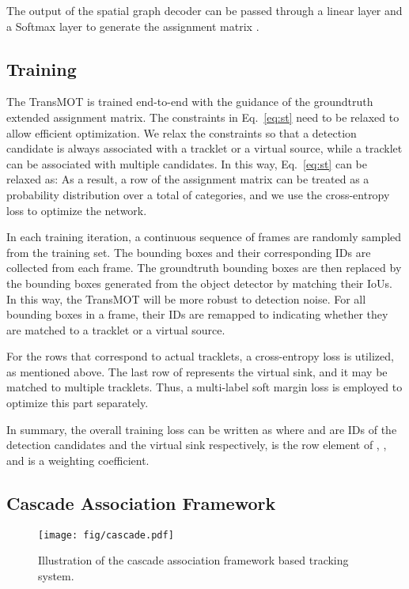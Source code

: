 \documentclass[10pt,twocolumn,letterpaper]{article}
\begin{document}
The output of the spatial graph decoder can be passed through a linear layer and a Softmax layer to generate the assignment matrix . 




\subsection{Training}
\label{sec:train}

The TransMOT is trained end-to-end with the guidance of the groundtruth extended assignment matrix. The constraints in Eq.~\ref{eq:st} need to be relaxed to allow efficient optimization. We relax the constraints so that a detection candidate is always associated with a tracklet or a virtual source, while a tracklet can be associated with multiple candidates. In this way, Eq.~\ref{eq:st} can be relaxed as:
\vspace{-3mm}
As a result, a row of the assignment matrix can be treated as a probability distribution over a total of  categories, and we use the cross-entropy loss to optimize the network. 

In each training iteration, a continuous sequence of  frames are randomly sampled from the training set. The bounding boxes and their corresponding IDs are collected from each frame. The groundtruth bounding boxes are then replaced by the bounding boxes generated from the object detector by matching their IoUs. In this way, the TransMOT will be more robust to detection noise. For all bounding boxes in a frame, their IDs are remapped to  indicating whether they are matched to a tracklet or a virtual source. 

For the rows that correspond to actual tracklets, a cross-entropy loss is utilized, as mentioned above.
The last row of  represents the virtual sink, and it may be matched to multiple tracklets. 
Thus, a multi-label soft margin loss is employed to optimize this part separately. 

In summary, the overall training loss can be written as
\vspace{-2mm}
where  and  are IDs of the detection candidates and the virtual sink respectively,  is the row element of , , and  is a weighting coefficient.

\subsection{Cascade Association Framework}
\label{sec:cascade}

\begin{figure}
	\centering
	\texttt{[image: fig/cascade.pdf]}
	\caption{Illustration of the cascade association framework based tracking system.}
	\label{fig:cascade}
\end{figure}
\end{document}
